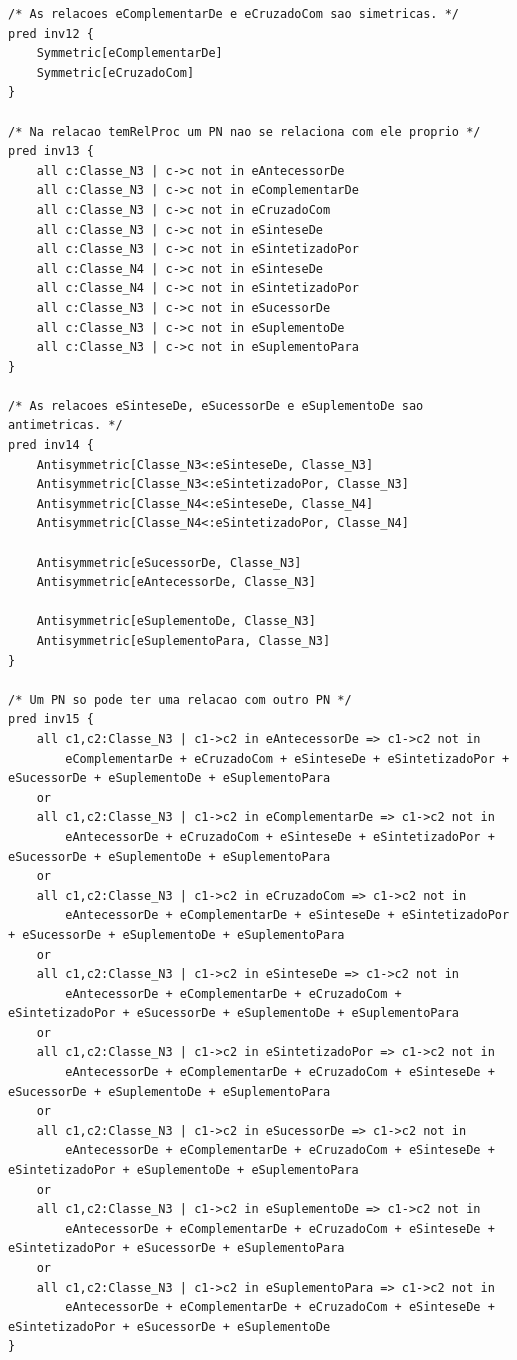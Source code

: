 \documentclass[tikz,runningheads,a4paper]{llncs}
\begin{document}
\begin{subappendices}
\begin{lstlisting}[language=alloy, frame=single]
/* As relacoes eComplementarDe e eCruzadoCom sao simetricas. */
pred inv12 {
	Symmetric[eComplementarDe]
	Symmetric[eCruzadoCom]
}

/* Na relacao temRelProc um PN nao se relaciona com ele proprio */
pred inv13 {
    all c:Classe_N3 | c->c not in eAntecessorDe
    all c:Classe_N3 | c->c not in eComplementarDe
    all c:Classe_N3 | c->c not in eCruzadoCom
    all c:Classe_N3 | c->c not in eSinteseDe
    all c:Classe_N3 | c->c not in eSintetizadoPor
    all c:Classe_N4 | c->c not in eSinteseDe
    all c:Classe_N4 | c->c not in eSintetizadoPor
    all c:Classe_N3 | c->c not in eSucessorDe
    all c:Classe_N3 | c->c not in eSuplementoDe
    all c:Classe_N3 | c->c not in eSuplementoPara
}

/* As relacoes eSinteseDe, eSucessorDe e eSuplementoDe sao antimetricas. */
pred inv14 {
	Antisymmetric[Classe_N3<:eSinteseDe, Classe_N3]
	Antisymmetric[Classe_N3<:eSintetizadoPor, Classe_N3]
	Antisymmetric[Classe_N4<:eSinteseDe, Classe_N4]
	Antisymmetric[Classe_N4<:eSintetizadoPor, Classe_N4]

	Antisymmetric[eSucessorDe, Classe_N3]
	Antisymmetric[eAntecessorDe, Classe_N3]

	Antisymmetric[eSuplementoDe, Classe_N3]
	Antisymmetric[eSuplementoPara, Classe_N3]
}

/* Um PN so pode ter uma relacao com outro PN */
pred inv15 {
	all c1,c2:Classe_N3 | c1->c2 in eAntecessorDe => c1->c2 not in
		eComplementarDe + eCruzadoCom + eSinteseDe + eSintetizadoPor + eSucessorDe + eSuplementoDe + eSuplementoPara
	or
	all c1,c2:Classe_N3 | c1->c2 in eComplementarDe => c1->c2 not in
		eAntecessorDe + eCruzadoCom + eSinteseDe + eSintetizadoPor + eSucessorDe + eSuplementoDe + eSuplementoPara
	or
	all c1,c2:Classe_N3 | c1->c2 in eCruzadoCom => c1->c2 not in
		eAntecessorDe + eComplementarDe + eSinteseDe + eSintetizadoPor + eSucessorDe + eSuplementoDe + eSuplementoPara
	or
	all c1,c2:Classe_N3 | c1->c2 in eSinteseDe => c1->c2 not in
	 	eAntecessorDe + eComplementarDe + eCruzadoCom + eSintetizadoPor + eSucessorDe + eSuplementoDe + eSuplementoPara
	or
	all c1,c2:Classe_N3 | c1->c2 in eSintetizadoPor => c1->c2 not in
		eAntecessorDe + eComplementarDe + eCruzadoCom + eSinteseDe + eSucessorDe + eSuplementoDe + eSuplementoPara
	or
	all c1,c2:Classe_N3 | c1->c2 in eSucessorDe => c1->c2 not in
		eAntecessorDe + eComplementarDe + eCruzadoCom + eSinteseDe + eSintetizadoPor + eSuplementoDe + eSuplementoPara
	or
	all c1,c2:Classe_N3 | c1->c2 in eSuplementoDe => c1->c2 not in
		eAntecessorDe + eComplementarDe + eCruzadoCom + eSinteseDe + eSintetizadoPor + eSucessorDe + eSuplementoPara
	or
	all c1,c2:Classe_N3 | c1->c2 in eSuplementoPara => c1->c2 not in
		eAntecessorDe + eComplementarDe + eCruzadoCom + eSinteseDe + eSintetizadoPor + eSucessorDe + eSuplementoDe
}


\end{lstlisting}
\end{subappendices}
\end{document}
